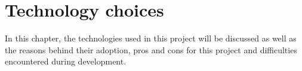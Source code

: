 \chapter{Technology choices}

  In this chapter, the technologies used in this project will be discussed
  as well as the reasons behind their adoption, pros and cons for this project
  and difficulties encountered during development.

  
  
  
  
